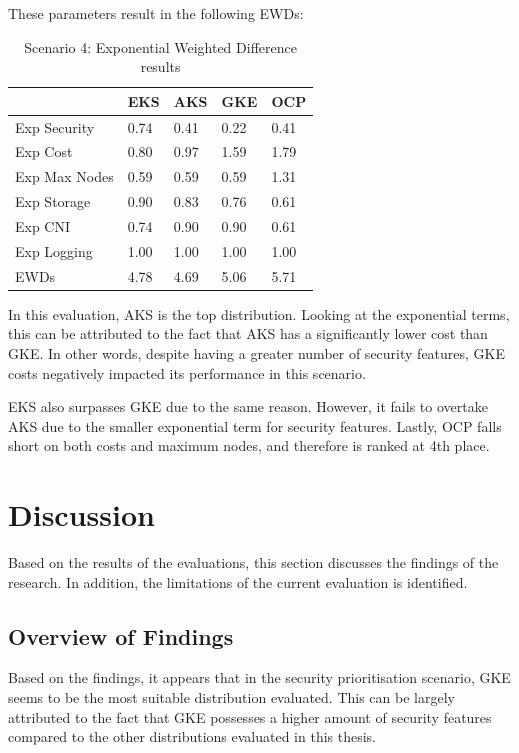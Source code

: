 These parameters result in the following EWDs:

\begin{table}[!ht]
    \centering
    \begin{tabular}{|p{4cm}|p{2cm}|p{2cm}|p{2cm}|p{2cm}|} %
    \hline
         & EKS& AKS& GKE& OCP\\ \hline
        Exp Security & 0.74 & 0.41 & 0.22 & 0.41 \\ \hline
        Exp Cost & 0.80 & 0.97 & 1.59 & 1.79 \\ \hline
        Exp Max Nodes & 0.59 & 0.59 & 0.59 & 1.31 \\ \hline
        Exp Storage & 0.90 & 0.83 & 0.76 & 0.61 \\ \hline
        Exp CNI & 0.74 & 0.90 & 0.90 & 0.61 \\ \hline
        Exp Logging & 1.00 & 1.00 & 1.00 & 1.00 \\ \hline
 EWDs& 4.78& 4.69 & 5.06 & 5.71 \\\hline
    \end{tabular}
    \caption{Scenario 4: Exponential Weighted Difference results} 
    \label{tab:scenario-4-ewds}
\end{table}

In this evaluation, AKS is the top distribution. Looking at the exponential terms, this can be attributed to the fact that AKS has a significantly lower cost than GKE. In other words, despite having a greater number of security features, GKE costs negatively impacted its performance in this scenario.

EKS also surpasses GKE due to the same reason. However, it fails to overtake AKS due to the smaller exponential term for security features. Lastly, OCP falls short on both costs and maximum nodes, and therefore is ranked at 4th place.

\chapter{Discussion}\label{discussion}
Based on the results of the evaluations, this section discusses the findings of the research. In addition, the limitations of the current evaluation is identified.

\section{Overview of Findings}
Based on the findings, it appears that in the security prioritisation scenario, GKE seems to be the most suitable distribution evaluated. This can be largely attributed to the fact that GKE possesses a higher amount of security features compared to the other distributions evaluated in this thesis.

